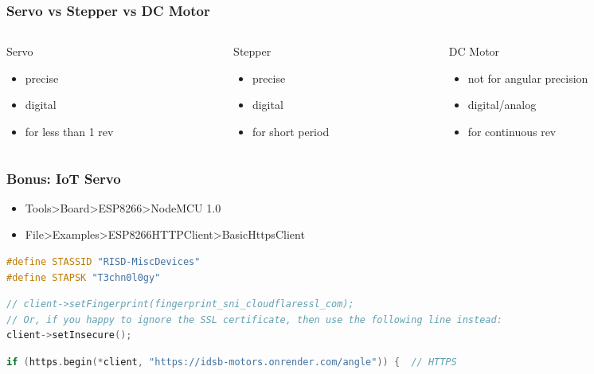\documentclass[compress, aspectratio=32]{beamer}
\begin{document}
\begin{frame}
    \frametitle{Servo vs Stepper vs DC Motor}
    \begin{columns}
        \begin{column}[]{0.3\textwidth}
            Servo
            \begin{itemize}
                \item precise
                \item digital
                \item for less than 1 rev
            \end{itemize}
        \end{column}
        \begin{column}[]{0.3\textwidth}
            Stepper
            \begin{itemize}
                \item precise
                \item digital
                \item for short period
            \end{itemize}
        \end{column}
        \begin{column}[]{0.3\textwidth}
            DC Motor
            \begin{itemize}
                \item not for angular precision
                \item digital/analog
                \item for continuous rev
            \end{itemize}
        \end{column}
    \end{columns}
\end{frame}

\begin{frame}[fragile]
    \frametitle{Bonus: IoT Servo}
    \begin{itemize}
        \item Tools>Board>ESP8266>NodeMCU 1.0
        \item File>Examples>ESP8266HTTPClient>BasicHttpsClient
    \end{itemize}
    \begin{lstlisting}[language=c, firstnumber=19]
#define STASSID "RISD-MiscDevices"
#define STAPSK "T3chn0l0gy"
    \end{lstlisting}
    
    \begin{lstlisting}[language=c, firstnumber=48]
// client->setFingerprint(fingerprint_sni_cloudflaressl_com);
// Or, if you happy to ignore the SSL certificate, then use the following line instead:
client->setInsecure();
    \end{lstlisting}
    \begin{lstlisting}[language=c, firstnumber=55] 
    if (https.begin(*client, "https://idsb-motors.onrender.com/angle")) {  // HTTPS
    \end{lstlisting}

\end{frame}
\end{document}
